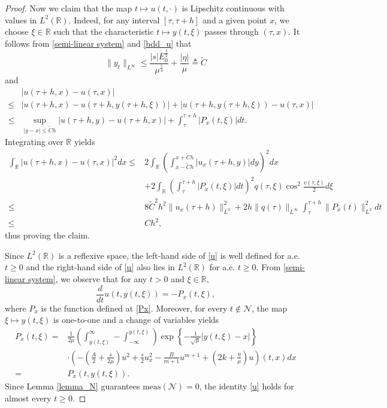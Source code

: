 \documentclass[10pt,a4paper]{amsart}
\begin{document}
\begin{proof}
		Now we claim that the map $t\mapsto u(t,\cdot)$ is Lipschitz continuous with values in $L^2(\mathbb{R})$. Indeed, for any interval $[\tau,\tau+h]$ and a given point $x$, we choose $\xi\in\mathbb{R}$ such that the characteristic $t\mapsto y(t,\xi)$ passes through $(\tau,x)$. It follows from \eqref{semi-linear system} and \eqref{bdd_u} that 
		$$\|y_t\|_{L^\infty}\leq\frac{|s|E_0^{\frac{1}{2}}}{\mu^{\frac{5}{4}}}+\frac{|\eta|}{\mu}\triangleq\widetilde{C}$$
		and 
		\begin{align*}
			&\left|u(\tau+h,x)-u(\tau,x)\right|\\
			\leq&\left|u(\tau+h,x)-u\left(\tau+h,y(\tau+h,\xi)\right)\right|  +\left|u\left(\tau+h,y(\tau+h,\xi)\right)-u(\tau,x)\right| \\
			\leq&\sup_{|y-x|\leq \widetilde{C}h}\left|u(\tau+h,y)-u(\tau+h,x)\right|+\int_{\tau}^{\tau+h}\left|P_{x}(t,\xi)\right|dt.
		\end{align*}
		Integrating over $\mathbb{R}$ yields
		\begin{align*}
			\int_\mathbb{R}\left|u(\tau+h,x)-u(\tau,x)\right|^2dx\leq&2\int_\mathbb{R}\left(\int_{x-\widetilde{C}h}^{x+\widetilde{C}h}\left|u_x(\tau+h,y)\right|dy\right)^2dx\\
			&+2\int_\mathbb{R}\left(\int_\tau^{\tau+h}\left|P_x(t,\xi)\right|dt\right)^2q(\tau,\xi)\cos^2\frac{v(\tau,\xi)}{2}d\xi\\
			\leq&8\widetilde{C}^2h^2\|u_x(\tau+h)\|_{L^2}^2+2h\|q(\tau)\|_{L^\infty}\int_\tau^{\tau+h}\|P_x(t)\|_{L^2}^2dt\\
			\leq&Ch^2,
		\end{align*}
		thus proving the claim.
		
		Since $L^2(\mathbb{R})$ is a reflexive space, the left-hand side of \eqref{u} is well defined for a.e. $t\geq0$ and the right-hand side of \eqref{u} also lies in $L^2(\mathbb{R})$ for a.e. $t\geq0$. From \eqref{semi-linear system}, we observe that for any $t>0$ and $\xi\in\mathbb{R}$,
		$$\frac{d}{dt}u\left(t,y(t,\xi)\right)=-P_x(t,\xi),$$
		where $P_x$ is the function defined at \eqref{Px}. Moreover, for every $t\notin\mathcal{N}$, the map $\xi\mapsto y(t,\xi)$ is one-to-one and a
		change of variables yields
		\begin{align*}
			P_x(t,\xi) 
			=&\frac{1}{2\mu}\left(\int_{y(t,\xi)}^{\infty}-\int_{-\infty}^{y(t,\xi)}\right)\exp\left\{-\frac{1}{\sqrt{\mu}}\left|y(t,\xi)-x\right|\right\}\\
			&\cdot\left(-\left(\frac{A}{2}+\frac{s}{2\mu}\right)u^2+\frac{s}{2}u_x^2-\frac{B}{m+1}u^{m+1}+\left(2k+\frac{\eta}{\mu}\right)u\right)(t,x)dx\\
			=&P_x(t,y(t,\xi)).
		\end{align*}
		Since Lemma \ref{lemma_N} guarantees $\mathrm{meas}(\mathcal{N})=0$, the identity \eqref{u} holds for almost every $t\geq0$.
		

\end{proof}
\end{document}
